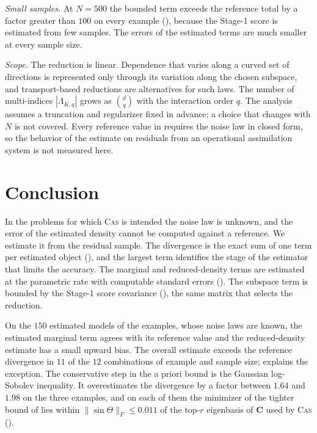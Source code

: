 \documentclass[review,hidelinks,onefignum,onetabnum]{siamart251216}
\newcommand{\mC}{\bm{C}}
\begin{document}
\emph{Small samples.} At $N = 500$ the bounded term exceeds the reference total by a factor greater than $100$ on every example (), because the Stage-1 score is estimated from few samples. The errors of the estimated terms are much smaller at every sample size.

\emph{Scope.} The reduction is linear. Dependence that varies along a curved set of directions is represented only through its variation along the chosen subspace, and transport-based reductions \cite{MarzoukMoselhyParnoSpantini2016, ChenArnaudBaptistaZahm2024} are alternatives for such laws. The number of multi-indices $|\Lambda_{K,q}|$ grows as $\binom{d}{q}$ with the interaction order $q$. The analysis assumes a truncation and regularizer fixed in advance; a choice that changes with $N$ is not covered. Every reference value in  requires the noise law in closed form, so the behavior of the estimate on residuals from an operational assimilation system is not measured here.


\section{Conclusion}
\label{sec:conclusion}

In the problems for which \textsc{Cas} is intended the noise law is unknown, and the error of the estimated density cannot be computed against a reference. We estimate it from the residual sample. The divergence is the exact sum of one term per estimated object (), and the largest term identifies the stage of the estimator that limits the accuracy. The marginal and reduced-density terms are estimated at the parametric rate with computable standard errors (). The subspace term is bounded by the Stage-1 score covariance (), the same matrix that selects the reduction.

On the $150$ estimated models of the examples, whose noise laws are known, the estimated marginal term agrees with its reference value and the reduced-density estimate has a small upward bias. The overall estimate exceeds the reference divergence in $11$ of the $12$ combinations of example and sample size;  explains the exception. The conservative step in the a priori bound is the Gaussian log-Sobolev inequality. It overestimates the divergence by a factor between $1.64$ and $1.98$ on the three examples, and on each of them the minimizer of the tighter bound of \cite{LiCuiLiMarzoukZahm2024sharp} lies within $\|\sin\Theta\|_F \le 0.011$ of the top-$r$ eigenbasis of $\mC$ used by \textsc{Cas} ().
\end{document}
